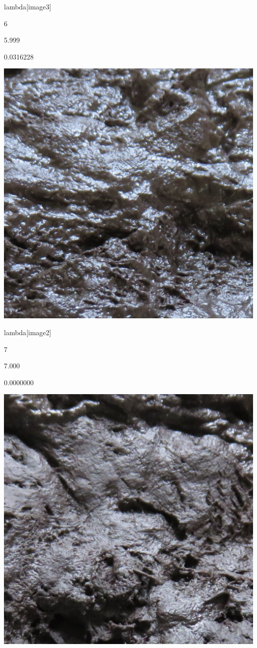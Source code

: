 \documentclass[
]{book}
\begin{document}
lambda{[}image3{]}

6

5.999

0.0316228

\includegraphics{data/moisture/Stimuli/image03.jpg}

lambda{[}image2{]}

7

7.000

0.0000000

\includegraphics{data/moisture/Stimuli/image02.jpg}
\end{document}
